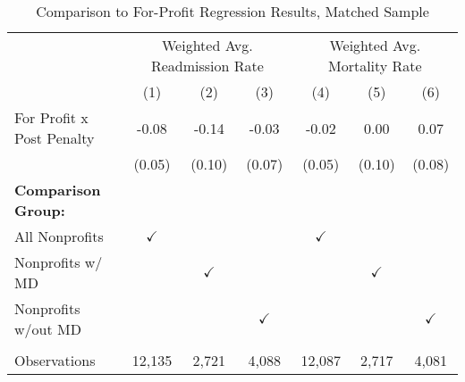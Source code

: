 \begin{table}[htbp]
   \caption{\label{tab:forprofit_matchsample} Comparison to For-Profit Regression Results, Matched Sample}
   \bigskip
   \centering
   \begin{tabular}{lcccccc}
      \toprule
       & \multicolumn{3}{c}{Weighted Avg. Readmission Rate} & \multicolumn{3}{c}{Weighted Avg. Mortality Rate}\\
                                  & (1)           & (2)           & (3)           & (4)           & (5)           & (6)\\  
      \midrule 
      For Profit x Post Penalty   & -0.08         & -0.14         & -0.03         & -0.02         & 0.00          & 0.07\\   
                                  & (0.05)        & (0.10)        & (0.07)        & (0.05)        & (0.10)        & (0.08)\\   
      \textbf{Comparison Group:}  &               &               &               &               &               & \\  
      All Nonprofits              & $\checkmark$  &               &               & $\checkmark$  &               & \\  
      Nonprofits w/ MD            &               & $\checkmark$  &               &               & $\checkmark$  & \\  
      Nonprofits w/out MD         &               &               & $\checkmark$  &               &               & $\checkmark$\\   
       \\
      Observations                & 12,135        & 2,721         & 4,088         & 12,087        & 2,717         & 4,081\\  
      \bottomrule
   \end{tabular}
\end{table}
